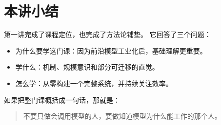 \section{本讲小结}

第一讲完成了课程定位，也完成了方法论铺垫。
它回答了三个问题：
\begin{itemize}
    \item 为什么要学这门课：因为前沿模型工业化后，基础理解更重要。
    \item 学什么：机制、规模意识和部分可迁移的直觉。
    \item 怎么学：从零构建一个完整系统，并持续关注效率。
\end{itemize}

如果把整门课概括成一句话，那就是：
\begin{quote}
不要只做会调用模型的人，要做知道模型为什么能工作的那个人。
\end{quote}

